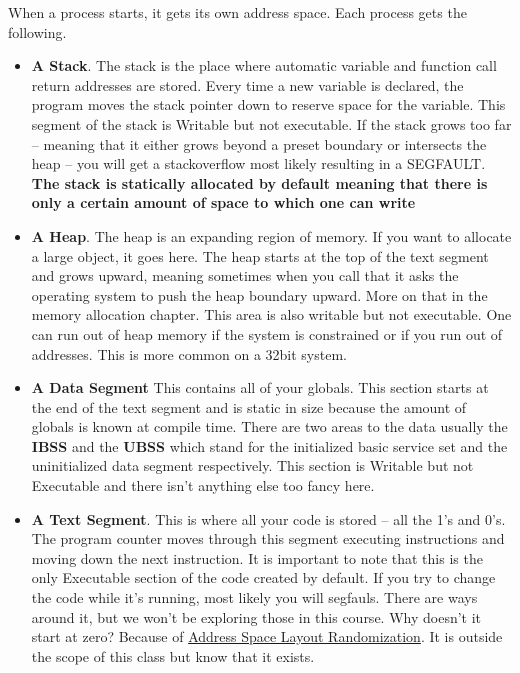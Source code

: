 When a process starts, it gets its own address space. Each process gets the following.
\begin{itemize}
\item \textbf{A Stack}.
The stack is the place where automatic variable and function call return addresses are stored.
Every time a new variable is declared, the program moves the stack pointer down to reserve space for the variable.
This segment of the stack is Writable but not executable.
If the stack grows too far -- meaning that it either grows beyond a preset boundary or intersects the heap -- you will get a stackoverflow most likely resulting in a SEGFAULT.
\textbf{The stack is statically allocated by default meaning that there is only a certain amount of space to which one can write} 

\item \textbf{A Heap}.
The heap is an expanding region of memory.
If you want to allocate a large object, it goes here.
The heap starts at the top of the text segment and grows upward, meaning sometimes when you call  that it asks the operating system to push the heap boundary upward.
More on that in the memory allocation chapter.
This area is also writable but not executable.
One can run out of heap memory if the system is constrained or if you run out of addresses. This is more common on a 32bit system. 

\item \textbf{A Data Segment} This contains all of your globals.
This section starts at the end of the text segment and is static in size because the amount of globals is known at compile time.
There are two areas to the data usually the \textbf{IBSS} and the \textbf{UBSS} which stand for the initialized basic service set and the uninitialized data segment respectively.
This section is Writable but not Executable and there isn't anything else too fancy here. 
\item \textbf{A Text Segment}.
This is where all your code is stored -- all the 1's and 0's.
The program counter moves through this segment executing instructions and moving down the next instruction.
It is important to note that this is the only Executable section of the code created by default.
If you try to change the code while it's running, most likely you will segfauls.
There are ways around it, but we won't be exploring those in this course.
Why doesn't it start at zero? Because of \href{https://en.wikipedia.org/wiki/Address_space_layout_randomization}{Address Space Layout Randomization}. It is outside the scope of this class but know that it exists.
\end{itemize}

